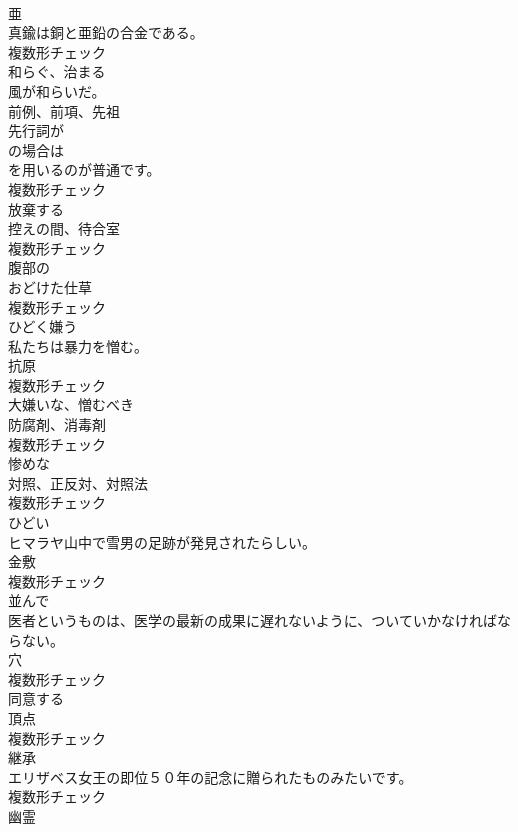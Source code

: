 \documentclass[8pt]{extreport}
\begin{document}
\begin{CJK}{UTF8}{min}
\\	[名詞]	亜	
\\	真鍮は銅と亜鉛の合金である。	
\\	複数形チェック
\\	[動詞]	和らぐ、治まる	
\\	風が和らいだ。	
\\	[名詞]	前例、前項、先祖	
\\	先行詞が
\\	の場合は
\\	を用いるのが普通です。	
\\	複数形チェック
\\	[動詞]	放棄する	
\\	[名詞]	控えの間、待合室	
\\	複数形チェック
\\	[形容詞]	腹部の	
\\	[名詞]	おどけた仕草	
\\	複数形チェック
\\	[動詞]	ひどく嫌う	
\\	私たちは暴力を憎む。	
\\	[名詞]	抗原	
\\	複数形チェック
\\	[形容詞]	大嫌いな、憎むべき	
\\	[名詞]	防腐剤、消毒剤	
\\	複数形チェック
\\	[形容詞]	惨めな	
\\	[名詞]	対照、正反対、対照法	
\\	複数形チェック
\\	[形容詞]	ひどい	
\\	ヒマラヤ山中で雪男の足跡が発見されたらしい。	
\\	[名詞]	金敷	
\\	複数形チェック
\\	[形容詞]	並んで	
\\	医者というものは、医学の最新の成果に遅れないように、ついていかなければならない。	
\\	[名詞]	穴	
\\	複数形チェック
\\	[動詞]	同意する	
\\	[名詞]	頂点	
\\	複数形チェック
\\	[名詞]	継承	
\\	エリザベス女王の即位５０年の記念に贈られたものみたいです。	
\\	複数形チェック
\\	[名詞]	幽霊	

\end{CJK}
\end{document}
